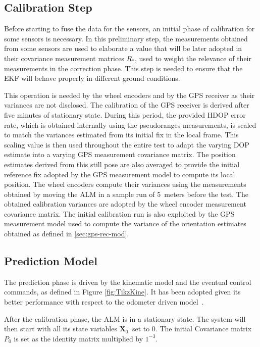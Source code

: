 \subsection{Calibration Step}
\noindent
Before starting to fuse the data for the sensors, an initial phase of calibration for some sensors is necessary.
In this preliminary step, the measurements obtained from some sensors are used to elaborate a value that will be later adopted in their covariance measurement matrices $R_*$, used to weight the relevance of their measurements in the correction phase. %
This step is needed to ensure that the \gls{EKF} will behave properly in different ground conditions.

This operation is needed by the wheel encoders and by the \gls{GPS} receiver as their variances are not disclosed.
The calibration of the GPS receiver is derived after five minutes of stationary state.
During this period, the provided \gls{HDOP} error rate, which is obtained internally using the pseudoranges measurements, is scaled to match the variances estimated from its initial fix in the local frame. 
This scaling value is then used throughout the entire test to adapt the varying \gls{DOP} estimate into a varying \gls{GPS} measurement covariance matrix.
The position estimates derived from this still pose are also averaged to provide the initial reference fix adopted by the \gls{GPS} measurement model to compute its local position.
The wheel encoders compute their variances using the measurements obtained by moving the \gls{ALM} in a sample run of \SI{5}{meters} before the test. 
The obtained calibration variances are adopted by the wheel encoder measurement covariance matrix.
The initial calibration run is also exploited by the \gls{GPS} measurement model used to compute the variance of the orientation estimates obtained as defined in \ref{sec:gps-rec-mod}.


\subsection{Prediction Model}

\noindent The prediction phase is driven by the kinematic model and the eventual control commands, as defined in Figure \ref{fig:TikzKine}.
It has been adopted given its better performance with respect to the odometer driven model~\cite{801027}.

After the calibration phase, the \gls{ALM} is in a stationary state.
The system will then start with all its state variables $\mathbf{X}_0^-$ set to $0$.
The initial Covariance matrix $P_0$ is set as the identity matrix multiplied by $1^{-3}$.

